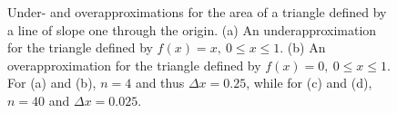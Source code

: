     \begin{figure}[htb]%
\centering
{}%
\hspace{5pt}%
%
\hspace{5pt}%
%
\hspace{5pt}%
%
    \caption[]{Under- and overapproximations for the area of a triangle defined by a line of slope one through the origin. (a) An underapproximation for the triangle defined by $f(x)=x,~ 0 \le x \le 1$. (b) An overapproximation for the triangle defined by $f(x)=0,~ 0 \le x \le 1$. For (a) and (b), $n=4$ and thus $\Delta x = 0.25$, while for (c) and (d), $n=40$ and $\Delta x = 0.025$.}
    \label{fig:ApproxAreaTriangle}
\end{figure}

